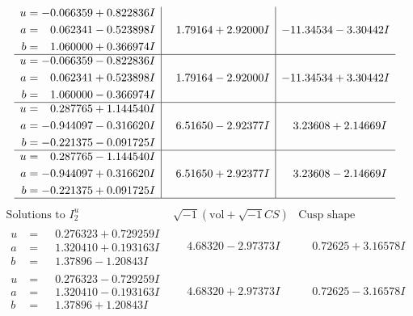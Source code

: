 \documentclass[1p]{elsarticle_modified}
\theoremstyle{definition}
\newcommand{\I}{\sqrt{-1}}
\begin{document}
$$\begin{array}{c|c|c}
\begin{aligned}
u &= -0.066359 + 0.822836 I \\
a &= \phantom{-}0.062341 - 0.523898 I \\
b &= \phantom{-}1.060000 + 0.366974 I\end{aligned}
 & \phantom{-}1.79164 + 2.92000 I & -11.34534 - 3.30442 I \\ \hline\begin{aligned}
u &= -0.066359 - 0.822836 I \\
a &= \phantom{-}0.062341 + 0.523898 I \\
b &= \phantom{-}1.060000 - 0.366974 I\end{aligned}
 & \phantom{-}1.79164 - 2.92000 I & -11.34534 + 3.30442 I \\ \hline\begin{aligned}
u &= \phantom{-}0.287765 + 1.144540 I \\
a &= -0.944097 - 0.316620 I \\
b &= -0.221375 - 0.091725 I\end{aligned}
 & \phantom{-}6.51650 - 2.92377 I & \phantom{-}3.23608 + 2.14669 I \\ \hline\begin{aligned}
u &= \phantom{-}0.287765 - 1.144540 I \\
a &= -0.944097 + 0.316620 I \\
b &= -0.221375 + 0.091725 I\end{aligned}
 & \phantom{-}6.51650 + 2.92377 I & \phantom{-}3.23608 - 2.14669 I\\
 \hline 
 \end{array}$$\newpage$$\begin{array}{c|c|c}  
\text{Solutions to }I^u_{2}& \I (\text{vol} + \sqrt{-1}CS) & \text{Cusp shape}\\
 \hline 
\begin{aligned}
u &= \phantom{-}0.276323 + 0.729259 I \\
a &= \phantom{-}1.320410 + 0.193163 I \\
b &= \phantom{-}1.37896 - 1.20843 I\end{aligned}
 & \phantom{-}4.68320 - 2.97373 I & \phantom{-}0.72625 + 3.16578 I \\ \hline\begin{aligned}
u &= \phantom{-}0.276323 - 0.729259 I \\
a &= \phantom{-}1.320410 - 0.193163 I \\
b &= \phantom{-}1.37896 + 1.20843 I\end{aligned}
 & \phantom{-}4.68320 + 2.97373 I & \phantom{-}0.72625 - 3.16578 I \\ \hline\begin{aligned}

\end{aligned}
\end{array}$$
\end{document}
